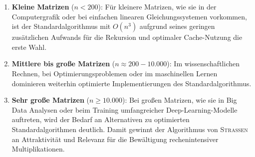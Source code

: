 \documentclass{scrartcl}
\numberwithin{equation}{section}
\begin{document}
\begin{enumerate}
	\item \textbf{Kleine Matrizen} ($n < 200$): Für kleinere Matrizen, wie sie in der Computergrafik oder bei einfachen linearen Gleichungssystemen vorkommen, ist der Standardalgorithmus mit $O(n^3)$ aufgrund seines geringen zusätzlichen Aufwands für die Rekursion und optimaler Cache-Nutzung die erste Wahl.
		
	\item \textbf{Mittlere bis große Matrizen} ($n \approx 200 - 10.000$): Im wissenschaftlichen Rechnen, bei Optimierungsproblemen oder im maschinellen Lernen dominieren weiterhin optimierte Implementierungen des Standardalgorithmus.
	
	\item \textbf{Sehr große Matrizen} ($n \ge 10.000$): Bei großen Matrizen, wie sie in Big Data Analysen oder beim Training umfangreicher Deep-Learning-Modelle auftreten, wird der Bedarf an Alternativen zu optimierten Standardalgorithmen deutlich. Damit gewinnt der Algorithmus von \textsc{Strassen} an Attraktivität und Relevanz für die Bewältigung rechenintensiver Multiplikationen.
\end{enumerate}
\end{document}
